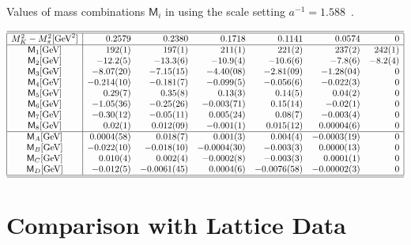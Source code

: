 \documentclass[twocolumn,nofootinbib,prd,aps,superscriptaddress,tightenlines]{revtex4}
\def\mreln{ \mathsf{M} }
\def\ufont#1{\text{#1}}
\begin{document}
\begin{table*}
\caption{\label{table:lattRelns} Values of mass combinations $\mreln_i$ in \ufont{GeV} using the scale setting $a^{-1}=1.588$~\ufont{GeV}.}
\begin{eqnarray*}
\begin{array}{|c|rrrrrr|}
\hline\hline
M_K^2 - M_\pi^2 [\ufont{GeV}^2]&0.2579 & 0.2380 & 0.1718 & 0.1141 & 0.0574& 0\\
\hline
\mreln_1 [\ufont{GeV}]& 192(1)& 197(1)& 211(1)& 221(2)& 237(2)& 242(1) \\
\mreln_2 [\ufont{GeV}]& -12.2(5) & -13.3(6) & -10.9(4) & -10.6(6) & -7.8(6)& -8.2(4) \\
\mreln_3 [\ufont{GeV}]& -8.07(20) & -7.15(15) & -4.40(08) & -2.81(09) & -1.28(04)& 0\\
\mreln_4 [\ufont{GeV}]&  -0.214(10)& -0.181(7)& -0.099(5)& -0.056(6)& -0.022(3)& 0\\
\mreln_5 [\ufont{GeV}]& 0.29(7)& 0.35(8)& 0.13(3)& 0.14(5)& 0.04(2)& 0 \\
\mreln_6 [\ufont{GeV}]& -1.05(36)& -0.25(26)& -0.003(71)& 0.15(14)& -0.02(1)& 0 \\
\mreln_7 [\ufont{GeV}]& -0.30(12)& -0.05(11)& 0.005(24)& 0.08(7)& -0.003(4)& 0 \\
\mreln_8 [\ufont{GeV}]& 0.02(1)& 0.012(09)& -0.001(1)& 0.015(12)& 0.00004(6)& 0 \\
\hline
\mreln_A [\ufont{GeV}]& 0.0004(58)& 0.018(7)& 0.001(3)& 0.004(4)& -0.0003(19)& 0 \\
\mreln_B [\ufont{GeV}]& -0.022(10)& -0.018(10)& -0.0004(30)& -0.003(3)& 0.0000(13)& 0 \\
\mreln_C [\ufont{GeV}]& 0.010(4)& 0.002(4)& -0.0002(8)& -0.003(3)& 0.0001(1)& 0 \\
\mreln_D [\ufont{GeV}]& -0.012(5)& -0.0061(45)& 0.0004(6)& -0.0076(58)& -0.00002(3)& 0 \\
\hline\hline
\end{array}
\end{eqnarray*}
\end{table*}


%
\section{Comparison with Lattice Data \label{sec:comparison}}
%
\end{document}
